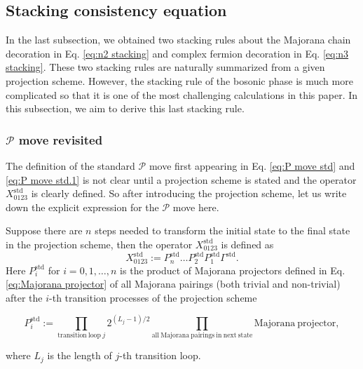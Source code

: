 \documentclass[%
 reprint,
 amsmath,amssymb,
 aps,
prb,
]{revtex4-2}
\begin{document}
\subsection{Stacking consistency equation}

In the last subsection, we obtained two stacking rules about the Majorana chain decoration in Eq. \eqref{eq:n2 stacking} and complex fermion decoration in Eq. \eqref{eq:n3 stacking}.
These two stacking rules are naturally summarized from a given projection scheme.
However, the stacking rule of the bosonic phase is much more complicated so that it is one of the most challenging calculations in this paper.
In this subsection, we aim to derive this last stacking rule.

\subsubsection{$\mathcal P$ move revisited}

The definition of the standard $\mathcal P$ move first appearing in Eq. \eqref{eq:P move std} and \eqref{eq:P move std.1} is not clear until a projection scheme is stated and the operator $X ^{\mathrm{std}} _{0123}$ is clearly defined.
So after introducing the projection scheme, let us write down the explicit expression for the $\mathcal P$ move here.

Suppose there are $n$ steps needed to transform the initial state to the final state in the projection scheme, then the operator $X ^{\mathrm{std}} _{0123}$ is defined as 
\begin{equation}
X ^{\mathrm{std}} _{0123} := P^{\mathrm{std}}_n \dots P^{\mathrm{std}}_2 P^{\mathrm{std}}_1 \Gamma^{\mathrm{std}} . \label{eq:X operator stacking}
\end{equation}
Here $P^{\mathrm{std}}_i$ for $i = 0, 1, \dots, n$ is the product of Majorana projectors defined in Eq. \eqref{eq:Majorana projector} of all Majorana pairings (both trivial and non-trivial) after the $i$-th transition processes of the projection scheme 
\begin{widetext}
\begin{equation}
P^{\mathrm{std}}_i := \prod_{\mathrm{transition \ loop} \ j} 2^{(L_j - 1)/2} \prod _{\mathrm{all \ Majorana \ pairings \ in \ next \ state}} \mathrm{Majorana \ projector} ,
\end{equation}
\end{widetext}
where $L_j$ is the length of $j$-th transition loop.
\end{document}
